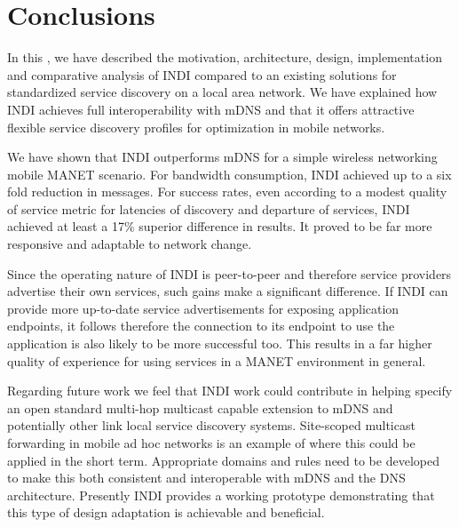 \section{Conclusions}
\label{sec:conclusions}

In this \doctype, we have described the motivation, architecture, design, implementation and comparative analysis of INDI compared to an existing solutions for standardized service discovery on a local area network.   We have explained how  INDI achieves full interoperability with mDNS and that it offers attractive flexible service discovery profiles for optimization  in mobile networks. 

We have shown that INDI outperforms mDNS for a simple wireless networking mobile MANET scenario.  For bandwidth consumption, INDI achieved up to a six fold reduction in messages.  For success rates, even according to a modest quality of service metric for latencies of discovery and departure of services, INDI achieved at least a 17\% superior difference in results. It proved to be far more responsive and adaptable to network change.
 
Since the operating nature of INDI is peer-to-peer and therefore service providers advertise their own services, such gains make a significant difference. If INDI can provide more up-to-date service advertisements for exposing application endpoints, it follows therefore the connection to its endpoint to use the application is also likely to be more successful too.   This results in a far higher quality of experience for using services in a MANET environment in general.

Regarding future work we feel that INDI work could contribute in helping specify an open standard multi-hop multicast capable extension to mDNS and potentially other link local service discovery systems. Site-scoped multicast forwarding in mobile ad hoc networks is an example of where this could be applied in the short term.  Appropriate domains and rules need to be developed to make this both consistent and interoperable with mDNS and the DNS architecture.  Presently INDI provides a working prototype demonstrating that this type of design adaptation is achievable and beneficial.
